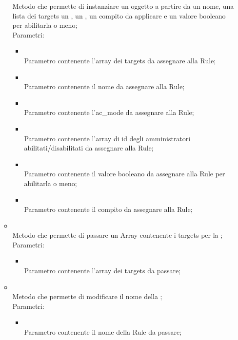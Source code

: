 \begin{itemize}
\begin{itemize}
		Metodo che permette di instanziare un oggetto  a partire da un nome, una lista dei targets un , un , un compito da applicare e un valore booleano per abilitarla o meno;\\
		Parametri:
		\begin{itemize}
			\item {} \\
			Parametro contenente l'array dei targets da assegnare alla Rule;
			\item {} \\
			Parametro contenente il nome da assegnare alla Rule;
			\item {} \\
			Parametro contenente l'ac\_mode da assegnare alla Rule;
			\item {} \\
			Parametro contenente l'array di id degli amministratori abilitati/disabilitati da assegnare alla Rule;
			\item {} \\
			Parametro contenente il valore booleano da assegnare alla Rule per abilitarla o meno;
			\item {} \\
			Parametro contenente il compito da assegnare alla Rule;
		\end{itemize}
		\item[]  \\
		Metodo che permette di passare un Array contenente i targets per la ;\\
		Parametri:
		\begin{itemize}
			\item {} \\
			Parametro contenente l'array dei targets da passare;
		\end{itemize}
		\item[]  \\
		Metodo che permette di modificare il nome della ;\\
		Parametri:
		\begin{itemize}
			\item {} \\
			Parametro contenente il nome della Rule da passare;
		\end{itemize}

\end{itemize}
\end{itemize}
